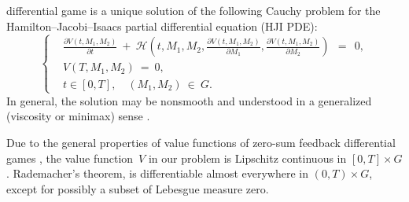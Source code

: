\documentclass[11pt]{amsart}
\begin{document}
differential game is a unique solution of the following Cauchy problem for the
Hamilton--Jacobi--Isaacs partial differential equation (HJI PDE):
\begin{equation}
\left\{ \begin{aligned}
& \frac{\partial V(t, M_1, M_2)}{\partial t} \: + \: \mathcal{H}
  \left( t, M_1, M_2, \frac{\partial V(t, M_1, M_2)}{\partial M_1},
  \frac{\partial V(t, M_1, M_2)}{\partial M_2} \right) \:\: = \:\: 0, \\
& V(T, M_1, M_2) \: = \: 0, \\
& t \in [0, T], \quad (M_1, M_2) \: \in \: G.
\end{aligned} \right.  \label{15}
\end{equation}
In general, the solution may be nonsmooth and understood in a generalized
(viscosity or minimax) sense \cite{FlemingSoner2006,Subbotin1995}.

Due to the general properties of value functions of zero-sum feedback
differential games \cite{BotkinHoffmannTurova2011}, the value function~$ V $
in our problem is Lipschitz continuous in $ [0, T] \times G $. Rademacher's
theorem, is differentiable almost everywhere in $ (0, T) \times G $, except
for possibly a subset of Lebesgue measure zero.
\end{document}
